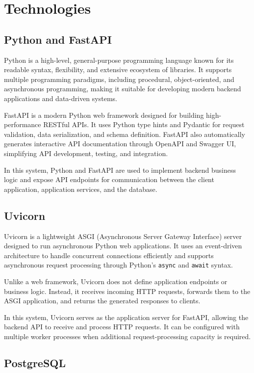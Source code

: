 \section{Technologies}

\subsection{Python and FastAPI}

Python is a high-level, general-purpose programming language known for
its readable syntax, flexibility, and extensive ecosystem of libraries.
It supports multiple programming paradigms, including procedural,
object-oriented, and asynchronous programming, making it suitable for
developing modern backend applications and data-driven systems.

FastAPI is a modern Python web framework designed for building
high-performance RESTful APIs. It uses Python type hints and Pydantic
for request validation, data serialization, and schema definition.
FastAPI also automatically generates interactive API documentation
through OpenAPI and Swagger UI, simplifying API development, testing,
and integration.

In this system, Python and FastAPI are used to implement backend
business logic and expose API endpoints for communication between
the client application, application services, and the database.

\subsection{Uvicorn}

Uvicorn is a lightweight ASGI (Asynchronous Server Gateway Interface)
server designed to run asynchronous Python web applications.
It uses an event-driven architecture to handle concurrent connections
efficiently and supports asynchronous request processing through
Python's \texttt{async} and \texttt{await} syntax.

Unlike a web framework, Uvicorn does not define application endpoints
or business logic. Instead, it receives incoming HTTP requests,
forwards them to the ASGI application, and returns the generated
responses to clients.

In this system, Uvicorn serves as the application server for FastAPI,
allowing the backend API to receive and process HTTP requests.
It can be configured with multiple worker processes when additional
request-processing capacity is required.

\subsection{PostgreSQL}

